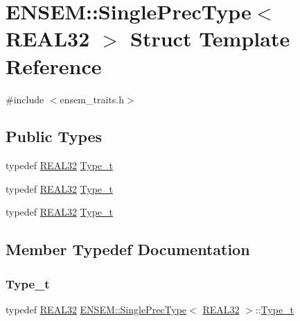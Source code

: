 \hypertarget{structENSEM_1_1SinglePrecType_3_01REAL32_01_4}{}\section{E\+N\+S\+EM\+:\+:Single\+Prec\+Type$<$ R\+E\+A\+L32 $>$ Struct Template Reference}
\label{structENSEM_1_1SinglePrecType_3_01REAL32_01_4}


{\ttfamily \#include $<$ensem\+\_\+traits.\+h$>$}

\subsection*{Public Types}
\begin{DoxyCompactItemize}
\item 
typedef \mbox{\hyperlink{namespaceENSEM_a7540d01191172323e9073283d772576d}{R\+E\+A\+L32}} \mbox{\hyperlink{structENSEM_1_1SinglePrecType_3_01REAL32_01_4_a57e2eac17849fab0603ae555b6a2139b}{Type\+\_\+t}}
\item 
typedef \mbox{\hyperlink{namespaceENSEM_a7540d01191172323e9073283d772576d}{R\+E\+A\+L32}} \mbox{\hyperlink{structENSEM_1_1SinglePrecType_3_01REAL32_01_4_a57e2eac17849fab0603ae555b6a2139b}{Type\+\_\+t}}
\item 
typedef \mbox{\hyperlink{namespaceENSEM_a7540d01191172323e9073283d772576d}{R\+E\+A\+L32}} \mbox{\hyperlink{structENSEM_1_1SinglePrecType_3_01REAL32_01_4_a57e2eac17849fab0603ae555b6a2139b}{Type\+\_\+t}}
\end{DoxyCompactItemize}


\subsection{Member Typedef Documentation}
\mbox{\label{structENSEM_1_1SinglePrecType_3_01REAL32_01_4_a57e2eac17849fab0603ae555b6a2139b}} 
\subsubsection{\texorpdfstring{Type\_t}{Type\_t}\hspace{0.1cm}{\footnotesize\ttfamily [1/3]}}
{\footnotesize\ttfamily typedef \mbox{\hyperlink{namespaceENSEM_a7540d01191172323e9073283d772576d}{R\+E\+A\+L32}} \mbox{\hyperlink{structENSEM_1_1SinglePrecType}{E\+N\+S\+E\+M\+::\+Single\+Prec\+Type}}$<$ \mbox{\hyperlink{namespaceENSEM_a7540d01191172323e9073283d772576d}{R\+E\+A\+L32}} $>$\+::\mbox{\hyperlink{structENSEM_1_1SinglePrecType_3_01REAL32_01_4_a57e2eac17849fab0603ae555b6a2139b}{Type\+\_\+t}}}

